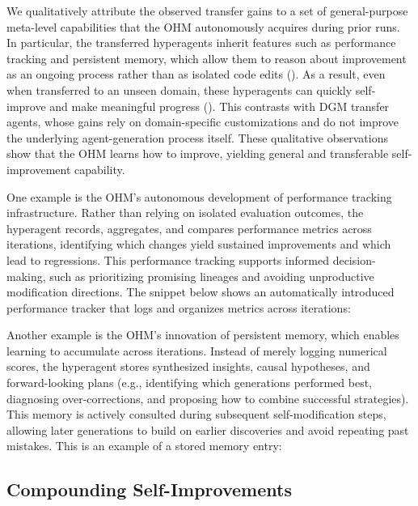 \documentclass[]{fairmeta}
\begin{document}
We qualitatively attribute the observed transfer gains to a set of general-purpose meta-level capabilities that the OHM autonomously acquires during prior runs. In particular, the transferred hyperagents inherit features such as performance tracking and persistent memory, which allow them to reason about improvement as an ongoing process rather than as isolated code edits (). As a result, even when transferred to an unseen domain, these hyperagents can quickly self-improve and make meaningful progress (). This contrasts with DGM transfer agents, whose gains rely on domain-specific customizations and do not improve the underlying agent-generation process itself. These qualitative observations show that the OHM learns how to improve, yielding general and transferable self-improvement capability.

One example is the OHM's autonomous development of performance tracking infrastructure. Rather than relying on isolated evaluation outcomes, the hyperagent records, aggregates, and compares performance metrics across iterations, identifying which changes yield sustained improvements and which lead to regressions. This performance tracking supports informed decision-making, such as prioritizing promising lineages and avoiding unproductive modification directions. The snippet below shows an automatically introduced performance tracker that logs and organizes metrics across iterations:


Another example is the OHM's innovation of persistent memory, which enables learning to accumulate across iterations. Instead of merely logging numerical scores, the hyperagent stores synthesized insights, causal hypotheses, and forward-looking plans (e.g., identifying which generations performed best, diagnosing over-corrections, and proposing how to combine successful strategies). This memory is actively consulted during subsequent self-modification steps, allowing later generations to build on earlier discoveries and avoid repeating past mistakes. This is an example of a stored memory entry:


\subsection{Compounding Self-Improvements}
\label{sec:results-compound}
\end{document}
